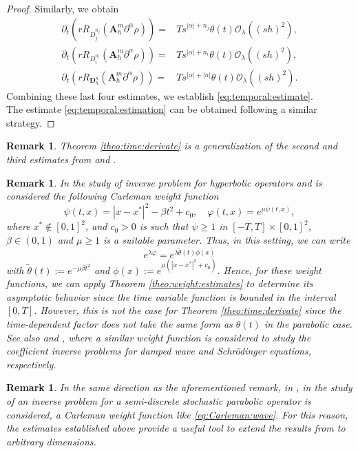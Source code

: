 \documentclass[11pt,oneside,leqno]{amsart}
\numberwithin{equation}{section}
\numberwithin{equation}{section}
\newtheorem{remark}[theorem]{Remark}
\begin{document}
\begin{proof}
Similarly, we obtain
\begin{align*}
    \partial_{t}(rR_{D^{n_{j}}_{j}}(\mathbf{A}_{h}^{m}\partial^{\alpha}\rho))=&Ts^{|\alpha|+n_{j}}\theta(t)\mathcal{O}_{\lambda}((sh)^{2}),\\
   \partial_{t}(rR_{D^{n_{i}}_{i}}(\mathbf{A}_{h}^{m}\partial^{\alpha}\rho))=&Ts^{|\alpha|+n_{i}}\theta(t)\mathcal{O}_{\lambda}((sh)^{2}),\\
   \partial_{t}(rR_{\mathbf{D}_{h}^{n}}(\mathbf{A}_{h}^{m}\partial^{\alpha}\rho))=&Ts^{|\alpha|+|n|}\theta(t)\mathcal{O}_{\lambda}((sh)^{2}).
\end{align*}
Combining these last four estimates, we establish \eqref{eq:temporal:estimate}.\\
The estimate \eqref{eq:temporal:estimation} can be obtained following a similar strategy.
\end{proof}
\begin{remark}
    Theorem \ref{theo:time:derivate} is a generalization of the second and third estimates from \cite[Proposition 2.14]{boyer-2014} and \cite{HS:2023}.  
\end{remark}

\begin{remark}\label{rmk:1} In the study of inverse problem for  hyperbolic operators \cite{BEO-2015,BE-2013} and \cite{B-B-E-O:2021} 
 is considered the following Carleman weight function 
 \begin{equation}\label{eq:Carleman:wave}
\psi(t,x) = |x - x^{\ast}|^2 - \beta t^2 + c_0, \quad \varphi(t,x) = e^{\mu \psi(t,x)},
\end{equation}
where $x^{\ast}\notin [0,1]^{2}$, and $c_0 > 0$ is such that $\psi \geq 1$ in $[-T,T] \times [0,1]^2$, $\beta\in(0,1)$ and $\mu \geq 1$ is a suitable parameter. Thus, in this setting, we can write
\begin{equation*}
    e^{\lambda\varphi}=e^{\lambda \tilde{\theta}(t) \phi(x)}
\end{equation*}
with $\tilde{\theta}(t):=e^{-\mu\beta t^{2}}$ and $\phi(x):=e^{\mu(|x-x^{\ast}|^{2}+c_{0})}$. Hence, for these weight functions, we can apply Theorem \ref{theo:weight:estimates} to determine its asymptotic behavior since the time variable function is bounded in the interval $[0,T]$. However, this is not the case for Theorem \ref{theo:time:derivate} since the time-dependent factor does not take the same form as $\theta(t)$ in the parabolic case. See also \cite{ZZ:2022} and \cite{ZZ:2023}, where a similar weight function is considered to study the coefficient inverse problems for damped wave and Schr\"{o}dinger equations, respectively. 
\end{remark}
\begin{remark}
In the same direction as the aforementioned remark, in \cite{WZ:2024}, in the study of an inverse problem for a semi-discrete stochastic parabolic operator is considered, a Carleman weight function like \eqref{eq:Carleman:wave}. For this reason, the estimates established above provide a useful tool to extend the results from \cite{WZ:2024} to arbitrary dimensions.
\end{remark}
\end{document}

